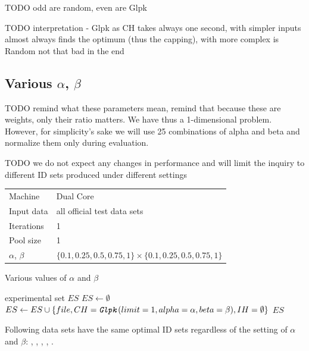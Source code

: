 TODO odd are random, even are Glpk

TODO interpretation - Glpk as CH takes always one second, with simpler inputs almost always finds the optimum (thus the capping), with more complex is Random not that bad in the end

\subsection{Various $\alpha$, $\beta$}

TODO remind what these parameters mean, remind that because these are weights, only their ratio matters. We have thus a 1-dimensional problem. However, for simplicity's sake we will use 25 combinations of alpha and beta and normalize them only during evaluation.

TODO we do not expect any changes in performance and will limit the inquiry to different ID sets produced under different settings

\begin{center}
\bigskip
\begin{tabular}{| l | l |}
  \hline
  \hline
  Machine           & Dual Core \\
  Input data        & all official test data sets \\
  Iterations        & 1 \\
  Pool size         & 1 \\
  $\alpha$, $\beta$ & $\{0.1, 0.25, 0.5, 0.75, 1\} \times \{0.1, 0.25, 0.5, 0.75, 1\}$ \\ %
  \hline
\end{tabular}
\bigskip
\end{center}

\begin{algorithm}
\caption{Various values of $\alpha$ and $\beta$}
\label{listing-experiment-various-betas}
\begin{algorithmic}
\ENSURE experimental set $ES$
\STATE $ES \gets \emptyset$
    	\STATE $ES \gets ES \cup \{file, CH = \texttt{\textit{Glpk}}(limit = 1, alpha = \alpha, beta = \beta), IH = \emptyset\}$
    \ENDFOR
  \ENDFOR
\ENDFOR
\RETURN $ES$
\end{algorithmic}
\end{algorithm}

Following data sets have the same optimal ID sets regardless of the setting of $\alpha$ and $\beta$: , , , , .

